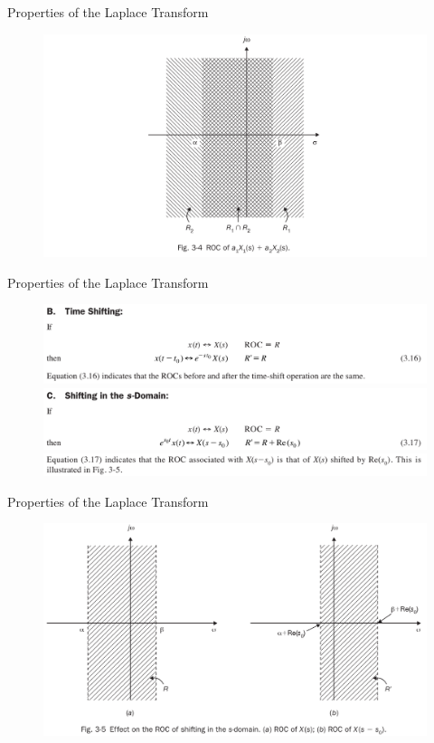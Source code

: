\documentclass[pdflatex,compress,mathserif]{beamer}
\begin{document}
\begin{frame}{Properties of the Laplace Transform}
	\begin{figure}
		\centering
		\includegraphics[width=\linewidth]{img/img17}
	\end{figure}
\end{frame}

\begin{frame}{Properties of the Laplace Transform}
	\begin{figure}
		\centering
		\includegraphics[width=\linewidth]{img/img18}
		\includegraphics[width=\linewidth]{img/img19}
		\includegraphics[width=\linewidth]{img/img20}
	\end{figure}
\end{frame}

\begin{frame}{Properties of the Laplace Transform}
	\begin{figure}
		\centering
		\includegraphics[width=\linewidth]{img/img21}
	\end{figure}
\end{frame}
\end{document}
